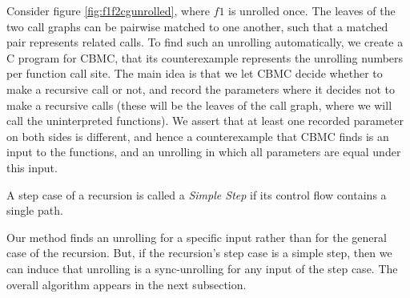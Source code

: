 Consider figure \ref{fig:f1f2cgunrolled}, where $f1$ is unrolled once. The leaves of the two call graphs can be pairwise matched to one another, such that a matched pair represents related calls. To find such an unrolling automatically, we create a C program for CBMC, that its counterexample represents the unrolling numbers per function call site. The main idea is that we let CBMC decide whether to make a recursive call or not, and record the parameters where it decides not to make a recursive calls (these will be the leaves of the call graph, where we will call the uninterpreted functions). We assert that at least one recorded parameter on both sides is different, and hence a counterexample that CBMC finds is an input to the functions, and an unrolling in which all parameters are equal under this input. 

\begin{definition}
A step case of a recursion is called a \emph{Simple Step} if its control flow contains a single path.
\end{definition}
Our method finds an unrolling for a specific input rather than for the general case of the recursion. But, if the recursion's step case is a simple step, then we can induce that unrolling is a sync-unrolling for any input of the step case.
The overall algorithm appears in the next subsection. 

